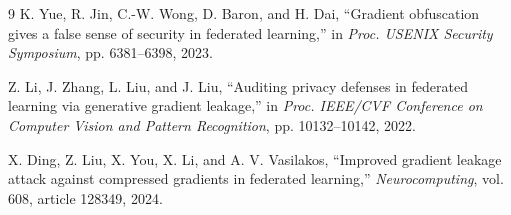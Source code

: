 \documentclass{article}
\begin{document}
\begin{thebibliography}{9}
K. Yue, R. Jin, C.-W. Wong, D. Baron, and H. Dai,
``Gradient obfuscation gives a false sense of security in federated learning,''
in \emph{Proc. USENIX Security Symposium}, pp. 6381--6398, 2023.

Z. Li, J. Zhang, L. Liu, and J. Liu,
``Auditing privacy defenses in federated learning via generative gradient leakage,''
in \emph{Proc. IEEE/CVF Conference on Computer Vision and Pattern Recognition},
pp. 10132--10142, 2022.

X. Ding, Z. Liu, X. You, X. Li, and A. V. Vasilakos,
``Improved gradient leakage attack against compressed gradients in federated learning,''
\emph{Neurocomputing}, vol. 608, article 128349, 2024.
\end{thebibliography}
\end{document}
